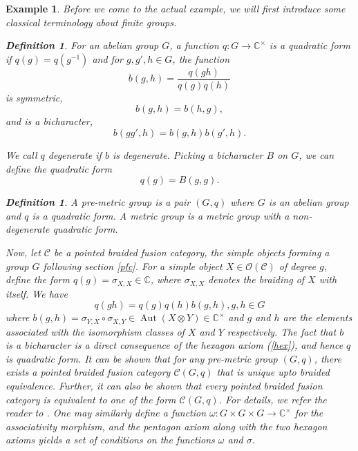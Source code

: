 \documentclass[a4paper, 10pt]{book}
\newtheorem{Expl}[theorem]{Example}
\theoremstyle{definition}
\newtheorem{Def}[theorem]{Definition}
\numberwithin{equation}{chapter}
\newcommand\inv{^{-1}}
\newcommand\ot{\otimes}
\newcommand\Aut{\operatorname{Aut}}
\newcommand\kk{\mathbb C}
\newcommand\C{\mathcal C}
\newcommand\OO{\mathcal O}
\newcommand{\ra}\rightarrow
\begin{document}
\begin{Expl}\rm
Before we come to the actual example, we will first introduce some classical terminology about finite groups.
\begin{Def}
For an abelian group $G$, a function $q:G\rightarrow \kk^\times$ is a \textit{quadratic form} if $q(g) = q(g\inv)$ and  for $g, g', h \in G$, the function \begin{equation}
	b(g, h) = \frac{q(gh)}{q(g)q(h)}
\end{equation} is symmetric, \begin{equation}
	b(g, h) = b(h, g),
\end{equation} and is a bicharacter, \begin{equation}
	b(gg', h) = b(g, h) b(g', h).
\end{equation}
\end{Def}
We call $q$ \textit{degenerate} if $b$ is degenerate. Picking a bicharacter $B$ on $G$, we can define the quadratic form \begin{equation}
	q(g) = B(g,g).
\end{equation}
\begin{Def}
A \textit{pre-metric group} is a pair $(G, q)$ where $G$ is an abelian group and $q$ is a quadratic form. A \textit{metric group} is a metric group with a non-degenerate quadratic form.	
\end{Def}
Now, let $\C$ be a pointed braided fusion category, the simple objects forming a group $G$ following section \ref{pfc}. For a simple object $X\in \OO(\C)$ of degree $g$, define the form $q(g) = \sigma_{X, X} \in \kk$, where $\sigma_{X, X}$ denotes the braiding of $X$ with itself. We have\begin{equation}
	q(gh) = q(g)q(h)b(g,h), g, h\in G
\end{equation}
where $b(g, h)  = \sigma_{Y, X} \circ \sigma_{X, Y}\in \Aut(X\ot Y) \in \kk^\times$ and $g$ and $h$ are the elements associated with the isomorphism classes of $X$ and $Y$ respectively. The fact that $b$ is a bicharacter is a direct consequence of the hexagon axiom (\ref{hex}), and hence $q$ is quadratic form. It can be shown that for any pre-metric group $(G, q)$, there exists a pointed braided fusion category $\C(G, q)$ that is unique upto braided equivalence. Further, it can also be shown that every pointed braided fusion category is equivalent to one of the form $\C(G, q)$. For details, we refer the reader to \cite[Section 8.4]{EGNO}.
\iffalse
One may similarly define a function $\omega: G\times G \times G \ra \kk^\times$ for the associativity morphism, and the pentagon axiom along with the two hexagon axioms yields a set of conditions on the functions $\omega$ and $\sigma$.

\end{Expl}
\end{document}
